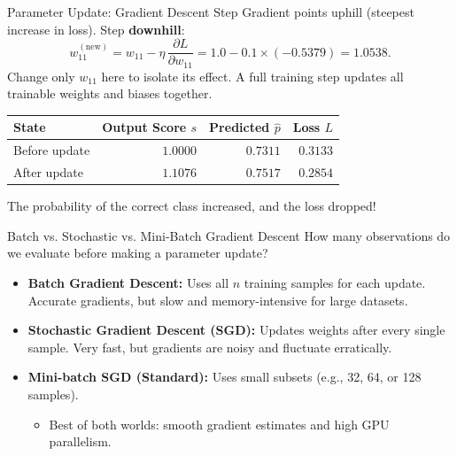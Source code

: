 \begin{frame}{Parameter Update: Gradient Descent Step}
    Gradient points uphill (steepest increase in loss). Step \textbf{downhill}:
    \[
        w_{11}^{(\text{new})} = w_{11} - \eta\,\frac{\partial L}{\partial w_{11}}
        = 1.0 - 0.1 \times (-0.5379) = \mathbf{1.0538}.
    \]
    Change only $w_{11}$ here to isolate its effect. A full training step updates all trainable weights and biases together.
    \begin{center}
    \small
    \begin{tabular}{lrrr}
    \toprule
    State & Output Score $s$ & Predicted $\hat{p}$ & Loss $L$ \\
    \midrule
    Before update & $1.0000$ & $0.7311$ & $0.3133$ \\
    After update & $1.1076$ & $0.7517$ & $\mathbf{0.2854}$ \\
    \bottomrule
    \end{tabular}
    \end{center}
    The probability of the correct class increased, and the loss dropped!
\end{frame}

\begin{frame}{Batch vs. Stochastic vs. Mini-Batch Gradient Descent}
    How many observations do we evaluate before making a parameter update?
    \begin{itemize}
        \item \textbf{Batch Gradient Descent:} Uses all $n$ training samples for each update. Accurate gradients, but slow and memory-intensive for large datasets.
        \item \textbf{Stochastic Gradient Descent (SGD):} Updates weights after every single sample. Very fast, but gradients are noisy and fluctuate erratically.
        \item \textbf{Mini-batch SGD (Standard):} Uses small subsets (e.g., 32, 64, or 128 samples).
        \begin{itemize}
            \item Best of both worlds: smooth gradient estimates and high GPU parallelism.
        \end{itemize}
    \end{itemize}
\end{frame}

